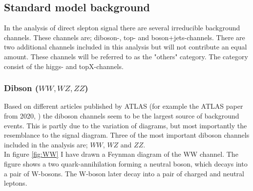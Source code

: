 \documentclass{article}
\begin{document}
\subsection{Standard model background}
In the analysis of direct slepton signal there are several irreducible background channels. These channels are; diboson-, top- and boson+jets-channels. There are two additional channels included in this analysis but will not contribute an equal amount. These channels will be referred to as the "others" category. The category consist of the higgs- and topX-channels.
\subsubsection{Dibson ($WW,WZ,ZZ$)}
Based on different articles published by ATLAS (for example the ATLAS paper from 2020, \cite{Aad_2020}) the diboson channels seem to be the largest source of background events. This is partly due to the variation of diagrams, but most importantly the resemblance to the signal diagram. Three of the most important diboson channels included in the analysis are; $WW$, $WZ$ and $ZZ$.
\\
In figure \ref{fig:WW} I have drawn a Feynman diagram of the WW channel. The figure shows a two quark-annihilation forming a neutral boson, which decays into a pair of W-bosons. The W-boson later decay into a pair of charged and neutral leptons. 
\end{document}
